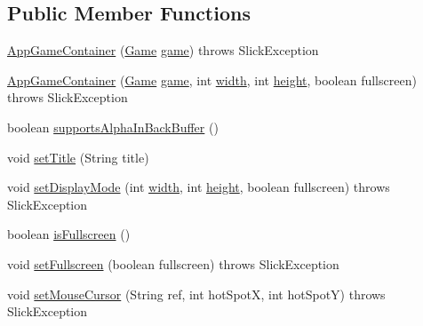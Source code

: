 \subsection*{Public Member Functions}
\begin{DoxyCompactItemize}
\item 
\mbox{\hyperlink{classorg_1_1newdawn_1_1slick_1_1_app_game_container_a17e6802ced18c1290dbc27fa5faa7221}{App\+Game\+Container}} (\mbox{\hyperlink{interfaceorg_1_1newdawn_1_1slick_1_1_game}{Game}} \mbox{\hyperlink{classorg_1_1newdawn_1_1slick_1_1_game_container_a6a38bb26e45e1c884940caf35c7cfcdc}{game}})  throws Slick\+Exception 
\item 
\mbox{\hyperlink{classorg_1_1newdawn_1_1slick_1_1_app_game_container_a7fd49f1d10b90d8c30368f9c31eb8116}{App\+Game\+Container}} (\mbox{\hyperlink{interfaceorg_1_1newdawn_1_1slick_1_1_game}{Game}} \mbox{\hyperlink{classorg_1_1newdawn_1_1slick_1_1_game_container_a6a38bb26e45e1c884940caf35c7cfcdc}{game}}, int \mbox{\hyperlink{classorg_1_1newdawn_1_1slick_1_1_game_container_a8c65160202b9f5aafde3fcf03e6155c9}{width}}, int \mbox{\hyperlink{classorg_1_1newdawn_1_1slick_1_1_game_container_aac7312a21bbcaabec14be965c683d970}{height}}, boolean fullscreen)  throws Slick\+Exception 
\item 
boolean \mbox{\hyperlink{classorg_1_1newdawn_1_1slick_1_1_app_game_container_a5a1e69d77e00826489cfeafd316e0e3e}{supports\+Alpha\+In\+Back\+Buffer}} ()
\item 
void \mbox{\hyperlink{classorg_1_1newdawn_1_1slick_1_1_app_game_container_a30cf85efc7ab454fd889cbc63d83a43e}{set\+Title}} (String title)
\item 
void \mbox{\hyperlink{classorg_1_1newdawn_1_1slick_1_1_app_game_container_aa2de68db61ddd3917a8edc0177ebdfe3}{set\+Display\+Mode}} (int \mbox{\hyperlink{classorg_1_1newdawn_1_1slick_1_1_game_container_a8c65160202b9f5aafde3fcf03e6155c9}{width}}, int \mbox{\hyperlink{classorg_1_1newdawn_1_1slick_1_1_game_container_aac7312a21bbcaabec14be965c683d970}{height}}, boolean fullscreen)  throws Slick\+Exception 
\item 
boolean \mbox{\hyperlink{classorg_1_1newdawn_1_1slick_1_1_app_game_container_a9003be0b2466514951f265f9ec2cb5b9}{is\+Fullscreen}} ()
\item 
void \mbox{\hyperlink{classorg_1_1newdawn_1_1slick_1_1_app_game_container_a9db75458ddb420ccf9b37de547ee2c42}{set\+Fullscreen}} (boolean fullscreen)  throws Slick\+Exception 
\item 
void \mbox{\hyperlink{classorg_1_1newdawn_1_1slick_1_1_app_game_container_ae67b08cdfec1664e0cf2882064cfb3c0}{set\+Mouse\+Cursor}} (String ref, int hot\+SpotX, int hot\+SpotY)  throws Slick\+Exception 

\end{DoxyCompactItemize}
